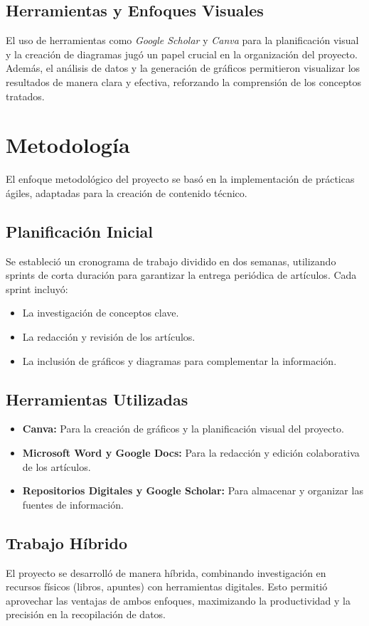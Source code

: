 \documentclass[12pt, a4paper]{article}
\begin{document}
\subsection{Herramientas y Enfoques Visuales}
El uso de herramientas como \textit{Google Scholar} y \textit{Canva} para la planificación visual y la creación de diagramas jugó un papel crucial en la organización del proyecto. Además, el análisis de datos y la generación de gráficos permitieron visualizar los resultados de manera clara y efectiva, reforzando la comprensión de los conceptos tratados.


\section{Metodología}
El enfoque metodológico del proyecto se basó en la implementación de prácticas ágiles, adaptadas para la creación de contenido técnico.

\subsection{Planificación Inicial}
Se estableció un cronograma de trabajo dividido en dos semanas, utilizando sprints de corta duración para garantizar la entrega periódica de artículos. Cada sprint incluyó: 
\begin{itemize}
    \item La investigación de conceptos clave.
    \item La redacción y revisión de los artículos.
    \item La inclusión de gráficos y diagramas para complementar la información.
\end{itemize}

\subsection{Herramientas Utilizadas}
\begin{itemize}
    \item \textbf{Canva:} Para la creación de gráficos y la planificación visual del proyecto.
    \item \textbf{Microsoft Word y Google Docs:} Para la redacción y edición colaborativa de los artículos.
    \item \textbf{Repositorios Digitales y Google Scholar:} Para almacenar y organizar las fuentes de información.
\end{itemize}

\subsection{Trabajo Híbrido}
El proyecto se desarrolló de manera híbrida, combinando investigación en recursos físicos (libros, apuntes) con herramientas digitales. Esto permitió aprovechar las ventajas de ambos enfoques, maximizando la productividad y la precisión en la recopilación de datos.
\end{document}
